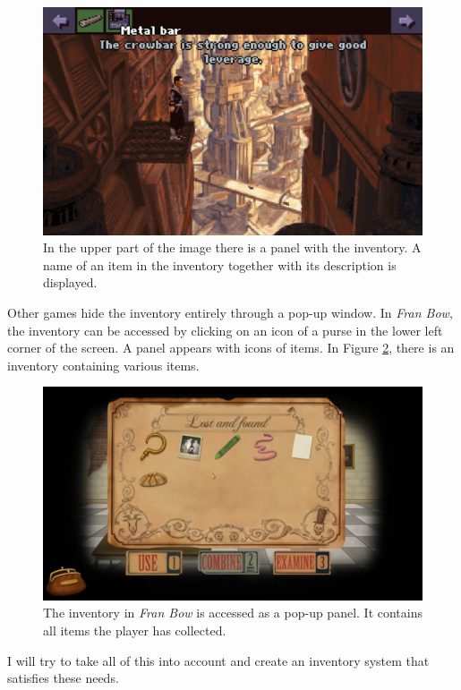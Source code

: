 \begin{figure}[H]
\centering
\includegraphics[width=1.\linewidth]{img/I-BaSS2.png}
\caption{In the upper part of the image there is a panel with the inventory. A name of an item in the inventory together with its description is displayed.}
\label{fig:I-BaSS2}
\end{figure}

Other games hide the inventory entirely through a pop-up window. In \textit{Fran Bow}, the inventory can be accessed by clicking on an icon of a purse in the lower left corner of the screen. A panel appears with icons of items. In Figure \ref{fig:I-FranBow}, there is an inventory containing various items.
\begin{figure}[H]
\centering
\includegraphics[width=1.\linewidth]{img/I-FB.png}
\caption{The inventory in \textit{Fran Bow} is accessed as a pop-up panel. It contains all items the player has collected.}
\label{fig:I-FranBow}
\end{figure}

I will try to take all of this into account and create an inventory system that satisfies these needs.
 
